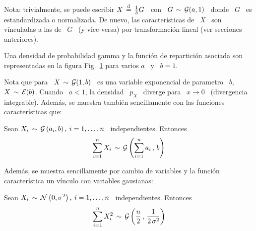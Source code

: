 Nota: trivialmente, se puede escribir $X \,  \stackrel{\mathrm{d}}{=} \, \frac{1}{b} G$ \ con \ $G
\, \sim \, \mathcal{G}(a,1)$  \ donde \ $G$ \ es estandardizada  o normalizada. De nuevo,
las  caracter\'isticas  de \  $X$  \  son  v\'inculadas a  las  de  \ $G$  \  (y
vice-versa) por transformaci\'on lineal (ver secciones anteriores).

Una densidad de probabilidad gamma  y la funci\'on de repartici\'on asociada son
representadas en  la figura Fig.~\ref{Fig:MP:Gamma} para  varios $a$ \ y  \ $b =
1$.
%
\begin{figure}[h!]
\begin{center}  \end{center}
%
\label{Fig:MP:Gamma}
\end{figure}

Nota  que para  \  $X \,  \sim  \, \mathcal{G}(1,b)$  \ es  una  variable exponencial  de
parametro \  $b$, \ie \ $X \,  \sim \, \mathcal{E}(b)$. Cuando  \ $a < 1$,  la densidad \
$p_X$  \ diverge  para \  $x  \to 0$  \ (divergencia  integrable). Adem\'as,  se
muestra tambi\'en sencillamente con las funciones caracter\'isticas que:
%
\begin{lema}[Stabilidad]
\label{Lem:MP:StabilidadGamma}
%
  Sean $X_i  \, \sim  \, \mathcal{G}\left( a_i  , b  \right), \: i  = 1 ,  \ldots ,  n$ \
  independientes. Entonces
  \[
  \sum_{i=1}^n X_i \, \sim \, \mathcal{G}\left( \sum_{i=1}^n a_i \, , \, b \right)
  \]
\end{lema}

Adem\'as,  se muestra  sencillamente  por  cambio de  variables  y la  funci\'on
caracter\'istica un v\'inculo con variables gausianas:
%
\begin{lema}
\label{Lem:MP:VinculoGammaGaussiana}
%
  Sean $X_i \, \sim \,  \mathcal{N}\left( 0 , \sigma^2 \right), \: i = 1  , \ldots , n$ \
  independientes. Entonces
  \[
  \sum_{i=1}^n  X_i^2 \,  \sim \,  \mathcal{G}\left( \frac{n}{2}  \, ,  \,  \frac{1}{2 \,
      \sigma^2} \right)
  \]
\end{lema}

